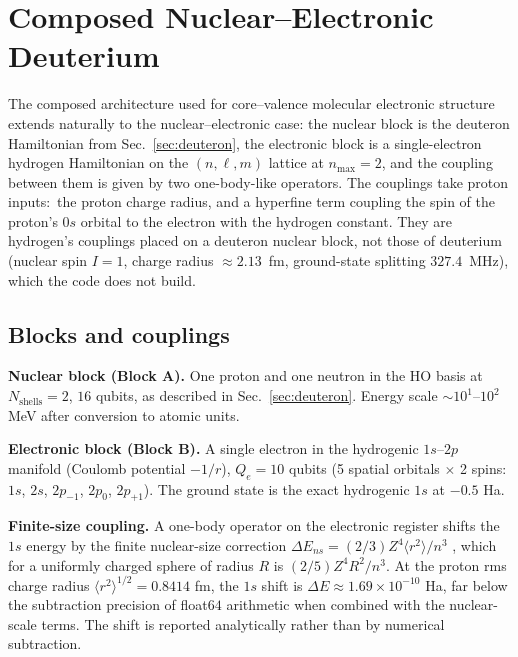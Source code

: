 \documentclass[twocolumn,prc,amsmath,amssymb,superscriptaddress]{revtex4-2}
\begin{document}
\section{Composed Nuclear--Electronic Deuterium}
\label{sec:ne}

The composed architecture used for core--valence molecular electronic
structure~\cite{Paper14,Paper17} extends naturally to the
nuclear--electronic case: the nuclear block is the deuteron
Hamiltonian from Sec.~\ref{sec:deuteron}, the electronic block is a
single-electron hydrogen Hamiltonian on the $(n, \ell, m)$ lattice at
$n_{\max}=2$, and the coupling between them is given by two
one-body-like operators. The couplings take proton inputs:\ the proton
charge radius, and a hyperfine term coupling the spin of the proton's
$0s$ orbital to the electron with the hydrogen constant. They are
hydrogen's couplings placed on a deuteron nuclear block, not those of
deuterium (nuclear spin $I = 1$, charge radius $\approx 2.13$~fm,
ground-state splitting $327.4$~MHz), which the code does not build.

\subsection{Blocks and couplings}

\textbf{Nuclear block (Block A).} One proton and one neutron in the
HO basis at $N_{\mathrm{shells}}=2$, $16$ qubits, as described in
Sec.~\ref{sec:deuteron}. Energy scale $\sim 10^1$--$10^2$ MeV after
conversion to atomic units.

\textbf{Electronic block (Block B).} A single electron in the
hydrogenic $1s$--$2p$ manifold (Coulomb potential $-1/r$), $Q_e = 10$
qubits (5 spatial orbitals $\times$ 2 spins: $1s$, $2s$, $2p_{-1}$,
$2p_0$, $2p_{+1}$). The ground state is the exact hydrogenic $1s$ at
$-0.5$ Ha.

\textbf{Finite-size coupling.} A one-body operator on the electronic
register shifts the $1s$ energy by the finite nuclear-size correction
$\Delta E_{ns} = (2/3) Z^4 \langle r^2\rangle / n^3$
\cite{Foldy1958,Friar1979}, which for a uniformly charged sphere of
radius $R$ is $(2/5) Z^4 R^2 / n^3$. At the proton rms charge radius
$\langle r^2\rangle^{1/2} = 0.8414$ fm, the $1s$ shift is
$\Delta E \approx 1.69 \times 10^{-10}$ Ha, far below the subtraction
precision of float$64$ arithmetic when combined with the nuclear-scale
terms. The shift is reported analytically rather than by numerical
subtraction.
\end{document}
